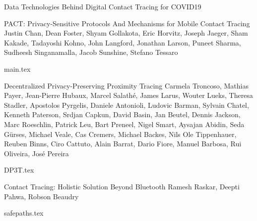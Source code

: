 \documentclass[11pt]{article}
\begin{document}
\begin{bulletin}
\begin{articlesection}{Data Technologies Behind Digital Contact Tracing for COVID19}
%
%
%




\makeatletter
\renewcommand{\AB@affillist}{}
\renewcommand{\AB@authlist}{}
\setcounter{authors}{0}
\makeatother

\begin{article}
{{PACT\/}:   {P\/}rivacy-Sensitive Protocols { A\/}nd Mechanisms for Mobile {C\/}ontact { T\/}racing}
{Justin Chan, Dean Foster, Shyam Gollakota, Eric Horvitz,  Joseph Jaeger, Sham Kakade, Tadayoshi Kohno, 
John Langford, Jonathan Larson, Puneet Sharma, Sudheesh Singanamalla,
Jacob Sunshine, Stefano Tessaro}
\graphicspath{{submissions/pact/}}
{main.tex}
\end{article}


\makeatletter
\renewcommand{\AB@affillist}{}
\renewcommand{\AB@authlist}{}
\setcounter{authors}{0}
\makeatother

\begin{article}
{Decentralized Privacy-Preserving Proximity Tracing}
{Carmela Troncoso, 
Mathias Payer, 
Jean-Pierre Hubaux, 
Marcel Salath\'e, 
James Larus, 
Wouter Lueks, 
Theresa Stadler,
Apostolos Pyrgelis,
Daniele Antonioli,
Ludovic Barman,
Sylvain Chatel,
Kenneth Paterson,
Srdjan Capkun, 
David Basin,
Jan Beutel,
Dennis Jackson,
Marc Roeschlin,
Patrick Leu,
Bart Preneel,
Nigel Smart,
Aysajan Abidin,
Seda G\"urses,
Michael Veale,
Cas Cremers,
Michael Backes,
Nils Ole Tippenhauer,
Reuben Binns,
Ciro Cattuto,
Alain Barrat,
Dario Fiore,
Manuel Barbosa,
Rui Oliveira,
Jos\'e Pereira}
\graphicspath{{submissions/dp3t/}}
{DP3T.tex}
\end{article}


\makeatletter
\renewcommand{\AB@affillist}{}
\renewcommand{\AB@authlist}{}
\setcounter{authors}{0}
\makeatother


\begin{article}
{Contact Tracing: Holistic Solution Beyond Bluetooth}
{Ramesh Raskar, Deepti Pahwa, Robson Beaudry }
\graphicspath{{submissions/safepaths/}}
{safepaths.tex}
\end{article}



\end{articlesection}
\end{bulletin}
\end{document}
